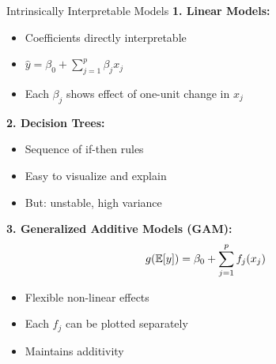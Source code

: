 \documentclass[aspectratio=169]{beamer}
\begin{document}
\begin{frame}{Intrinsically Interpretable Models}
  \textbf{1. Linear Models:}
  \begin{itemize}
    \item Coefficients directly interpretable
    \item $\hat{y} = \beta_0 + \sum_{j=1}^p \beta_j x_j$
    \item Each $\beta_j$ shows effect of one-unit change in $x_j$
  \end{itemize}

  \vspace{0.5em}

  \textbf{2. Decision Trees:}
  \begin{itemize}
    \item Sequence of if-then rules
    \item Easy to visualize and explain
    \item But: unstable, high variance
  \end{itemize}

  \vspace{0.5em}

  \textbf{3. Generalized Additive Models (GAM):}
  \begin{equation}
    g(\mathbb{E}[y]) = \beta_0 + \sum_{j=1}^p f_j(x_j)
  \end{equation}
  \begin{itemize}
    \item Flexible non-linear effects
    \item Each $f_j$ can be plotted separately
    \item Maintains additivity
  \end{itemize}
\end{frame}
\end{document}
